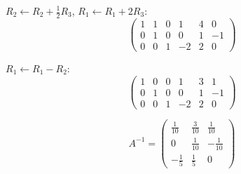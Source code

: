 $R_2 \leftarrow R_2 + \frac{1}{2}R_3$, $R_1 \leftarrow R_1 + 2R_3$:
\[
	\left(\begin{array}{ccc|ccc}
			1 & 1 & 0 & 1  & 4 & 0  \\
			0 & 1 & 0 & 0  & 1 & -1 \\
			0 & 0 & 1 & -2 & 2 & 0
		\end{array}\right)
\]

$R_1 \leftarrow R_1 - R_2$:
\[
	\left(\begin{array}{ccc|ccc}
			1 & 0 & 0 & 1  & 3 & 1  \\
			0 & 1 & 0 & 0  & 1 & -1 \\
			0 & 0 & 1 & -2 & 2 & 0
		\end{array}\right)
\]

\[
	A^{-1} = \begin{pmatrix}
		\frac{1}{10} & \frac{3}{10} & \frac{1}{10}  \\
		0            & \frac{1}{10} & -\frac{1}{10} \\
		-\frac{1}{5} & \frac{1}{5}  & 0
	\end{pmatrix}
\]